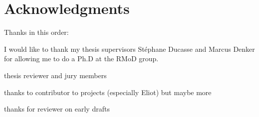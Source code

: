 \documentclass[a4paper,12pt,twoside]{includes/ThesisStyle}
\begin{document}

\dominitoc


\cleardoublepage

\section*{Acknowledgments}

Thanks in this order:

I would like to thank my thesis supervisors St\'ephane Ducasse and Marcus Denker for allowing me to do a Ph.D at the RMoD group.

thesis reviewer and jury members

thanks to contributor to projects (especially Eliot) but maybe more

thanks for reviewer on early drafts


\tableofcontents
\listoffigures
\listoftables

\mainmatter








\appendix





\end{document}
